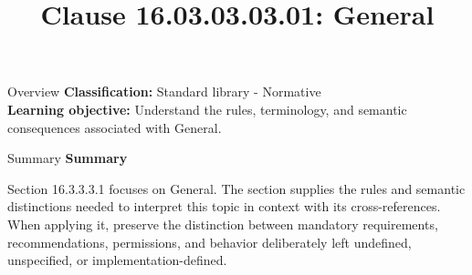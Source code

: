 \documentclass[10pt,letterpaper]{article}
\title{Clause 16.03.03.03.01: General}
\author{}
\date{}
\begin{document}
\maketitle
\begin{CornellOverviewBox}{Overview}
\textbf{Classification:} Standard library - Normative\\[2pt]
\textbf{Learning objective:} Understand the rules, terminology, and semantic consequences associated with General.
\end{CornellOverviewBox}\begin{CornellSummaryBox}{Summary}
{\sffamily\bfseries\color{Accent} Summary}\par\vspace{3pt}Section 16.3.3.3.1 focuses on General. The section supplies the rules and semantic distinctions needed to interpret this topic in context with its cross-references. When applying it, preserve the distinction between mandatory requirements, recommendations, permissions, and behavior deliberately left undefined, unspecified, or implementation-defined.
\end{CornellSummaryBox}
\end{document}
